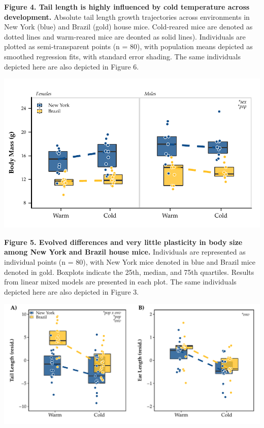 \documentclass[]{article}
\begin{document}
\textbf{Figure 4. Tail length is highly influenced by cold temperature
across development.} Absolute tail length growth trajectories across
environments in New York (blue) and Brazil (gold) house mice.
Cold-reared mice are denoted as dotted lines and warm-reared mice are
deonted as solid lines). Individuals are plotted as semi-transparent
points (n = 80), with population means depicted as smoothed regression
fits, with standard error shading. The same individuals depicted here
are also depicted in Figure 6.

\newpage

\includegraphics{../results/figures/RXNs_BW.pdf}

\textbf{Figure 5. Evolved differences and very little plasticity in body
size among New York and Brazil house mice.} Individuals are represented
as individual points (n = 80), with New York mice denoted in blue and
Brazil mice denoted in gold. Boxplots indicate the 25th, median, and
75th quartiles. Results from linear mixed models are presented in each
plot. The same individuals depicted here are also depicted in Figure 3.

\newpage

\includegraphics{../results/figures/RXNs_Extremities.pdf}
\end{document}
